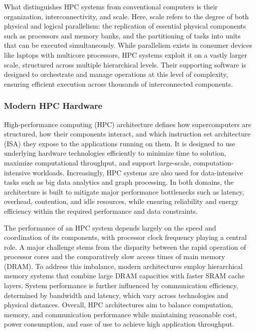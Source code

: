
What distinguishes HPC systems from conventional computers is their organization, interconnectivity, and scale. Here, scale refers to the degree of both physical and logical parallelism: the replication of essential physical components such as processors and memory banks, and the partitioning of tasks into units that can be executed simultaneously. While parallelism exists in consumer devices like laptops with multicore processors, HPC systems exploit it on a vastly larger scale, structured across multiple hierarchical levels. Their supporting software is designed to orchestrate and manage operations at this level of complexity, ensuring efficient execution across thousands of interconnected components.

\subsubsection{Modern HPC Hardware}
\label{sec:background_hpc_hardware}
High-performance computing (HPC) architecture defines how supercomputers are structured, how their components interact, and which instruction set architecture (ISA) they expose to the applications running on them. It is designed to use underlying hardware technologies efficiently to minimize time to solution, maximize computational throughput, and support large-scale, computation-intensive workloads. Increasingly, HPC systems are also used for data-intensive tasks such as big data analytics and graph processing. In both domains, the architecture is built to mitigate major performance bottlenecks such as latency, overhead, contention, and idle resources, while ensuring reliability and energy efficiency within the required performance and data constraints.


The performance of an HPC system depends largely on the speed and coordination of its components, with processor clock frequency playing a central role. A major challenge stems from the disparity between the rapid operation of processor cores and the comparatively slow access times of main memory (DRAM). To address this imbalance, modern architectures employ hierarchical memory systems that combine large DRAM capacities with faster SRAM cache layers. System performance is further influenced by communication efficiency, determined by bandwidth and latency, which vary across technologies and physical distances. Overall, HPC architectures aim to balance computation, memory, and communication performance while maintaining reasonable cost, power consumption, and ease of use to achieve high application throughput.

